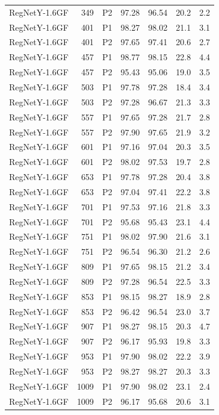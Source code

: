 {\begin{longtable}{lrlrrrr}
RegNetY-1.6GF & 349 & P2 & 97.28 & 96.54 & 20.2 & 2.2 \\
RegNetY-1.6GF & 401 & P1 & 98.27 & 98.02 & 21.1 & 3.1 \\
RegNetY-1.6GF & 401 & P2 & 97.65 & 97.41 & 20.6 & 2.7 \\
RegNetY-1.6GF & 457 & P1 & 98.77 & 98.15 & 22.8 & 4.4 \\
RegNetY-1.6GF & 457 & P2 & 95.43 & 95.06 & 19.0 & 3.5 \\
RegNetY-1.6GF & 503 & P1 & 97.78 & 97.28 & 18.4 & 3.4 \\
RegNetY-1.6GF & 503 & P2 & 97.28 & 96.67 & 21.3 & 3.3 \\
RegNetY-1.6GF & 557 & P1 & 97.65 & 97.28 & 21.7 & 2.8 \\
RegNetY-1.6GF & 557 & P2 & 97.90 & 97.65 & 21.9 & 3.2 \\
RegNetY-1.6GF & 601 & P1 & 97.16 & 97.04 & 20.3 & 3.5 \\
RegNetY-1.6GF & 601 & P2 & 98.02 & 97.53 & 19.7 & 2.8 \\
RegNetY-1.6GF & 653 & P1 & 97.78 & 97.28 & 20.4 & 3.8 \\
RegNetY-1.6GF & 653 & P2 & 97.04 & 97.41 & 22.2 & 3.8 \\
RegNetY-1.6GF & 701 & P1 & 97.53 & 97.16 & 21.8 & 3.3 \\
RegNetY-1.6GF & 701 & P2 & 95.68 & 95.43 & 23.1 & 4.4 \\
RegNetY-1.6GF & 751 & P1 & 98.02 & 97.90 & 21.6 & 3.1 \\
RegNetY-1.6GF & 751 & P2 & 96.54 & 96.30 & 21.2 & 2.6 \\
RegNetY-1.6GF & 809 & P1 & 97.65 & 98.15 & 21.2 & 3.4 \\
RegNetY-1.6GF & 809 & P2 & 97.28 & 96.54 & 22.5 & 3.3 \\
RegNetY-1.6GF & 853 & P1 & 98.15 & 98.27 & 18.9 & 2.8 \\
RegNetY-1.6GF & 853 & P2 & 96.42 & 96.54 & 23.0 & 3.7 \\
RegNetY-1.6GF & 907 & P1 & 98.27 & 98.15 & 20.3 & 4.7 \\
RegNetY-1.6GF & 907 & P2 & 96.17 & 95.93 & 19.8 & 3.3 \\
RegNetY-1.6GF & 953 & P1 & 97.90 & 98.02 & 22.2 & 3.9 \\
RegNetY-1.6GF & 953 & P2 & 98.27 & 98.27 & 20.3 & 3.3 \\
RegNetY-1.6GF & 1009 & P1 & 97.90 & 98.02 & 23.1 & 2.4 \\
RegNetY-1.6GF & 1009 & P2 & 96.17 & 95.68 & 20.6 & 3.1 \\

\end{longtable}}
